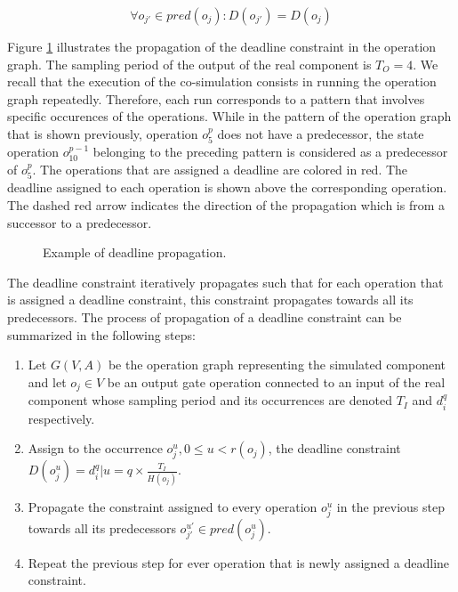 \begin{equation}
\forall o_{j'} \in pred(o_j): D(o_{j'}) = D(o_j)
\label{eq:release}
\end{equation}

Figure \ref{fig:dpropagation} illustrates the propagation of the deadline constraint in the operation graph. The sampling period of the output of the real component is $T_O = 4$. We recall that the execution of the co-simulation consists in running the operation graph repeatedly. Therefore, each run corresponds to a pattern that involves specific occurences of the operations. While in the pattern of the operation graph that is shown previously, operation $o_5^p$ does not have a predecessor, the state operation $o_10^{p-1}$ belonging to the preceding pattern is considered as a predecessor of $o_5^{p}$. The operations that are assigned a deadline are colored in red. The deadline assigned to each operation is shown above the corresponding operation. The dashed red arrow indicates the direction of the propagation which is from a successor to a predecessor.

\begin{figure}[phbt]
\centering

\caption{Example of deadline propagation.}
\label{fig:dpropagation}
\end{figure}

The deadline constraint iteratively propagates such that for each operation that is assigned a deadline constraint, this constraint propagates towards all its predecessors. The process of propagation of a deadline constraint can be summarized in the following steps:

\begin{enumerate}
\item Let $G(V,A)$ be the operation graph representing the simulated component and let $o_j \in  V$ be an output gate operation connected to an input of the real component whose sampling period and its occurrences are denoted $T_I$ and $d_i^q$ respectively.
\item Assign to the occurrence $o_j^u, 0 \leq u < r(o_j)$, the deadline constraint $D(o_j^u) = d_i^q | u = q \times \frac{T_I}{H(o_j)}$.
\item Propagate the constraint assigned to every operation $o_j^u$ in the previous step towards all its predecessors $o_{j'}^{u'} \in pred(o_j^u)$.
\item Repeat the previous step for ever operation that is newly assigned a deadline constraint.
\end{enumerate}

